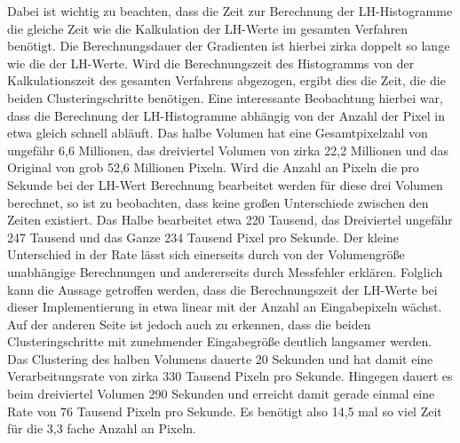 Dabei ist wichtig zu beachten, dass die Zeit zur Berechnung der LH-Histogramme die gleiche Zeit wie die Kalkulation der LH-Werte im gesamten Verfahren benötigt. Die Berechnungsdauer der Gradienten ist hierbei zirka doppelt so lange wie die der LH-Werte. Wird die Berechnungszeit des Histogramms von der Kalkulationszeit des gesamten Verfahrens abgezogen, ergibt dies die Zeit, die die beiden Clusteringschritte benötigen.
Eine interessante Beobachtung hierbei war, dass die Berechnung der LH-Histogramme abhängig von der Anzahl der Pixel in etwa gleich schnell abläuft. Das halbe Volumen hat eine Gesamtpixelzahl von ungefähr 6,6 Millionen, das dreiviertel Volumen von zirka 22,2 Millionen und das Original von grob 52,6 Millionen Pixeln.
\newline
Wird die Anzahl an Pixeln die pro Sekunde bei der LH-Wert Berechnung bearbeitet werden für diese drei Volumen berechnet, so ist zu beobachten, dass keine großen Unterschiede zwischen den Zeiten existiert.
Das Halbe bearbeitet etwa 220 Tausend, das Dreiviertel ungefähr 247 Tausend und das Ganze 234 Tausend Pixel pro Sekunde. Der kleine Unterschied in der Rate lässt sich einerseits durch von der Volumengröße unabhängige Berechnungen und andererseits durch Messfehler erklären. Folglich kann die Aussage getroffen werden, dass die Berechnungszeit der LH-Werte bei dieser Implementierung in etwa linear mit der Anzahl an Eingabepixeln wächst.
Auf der anderen Seite ist jedoch auch zu erkennen, dass die beiden Clusteringschritte mit zunehmender Eingabegröße deutlich langsamer werden. Das Clustering des halben Volumens dauerte 20 Sekunden und hat damit eine Verarbeitungsrate von zirka 330 Tausend Pixeln pro Sekunde. Hingegen dauert es beim dreiviertel Volumen 290 Sekunden und erreicht damit gerade einmal eine Rate von 76 Tausend Pixeln pro Sekunde. Es benötigt also 14,5 mal so viel Zeit für die 3,3 fache Anzahl an Pixeln.














































